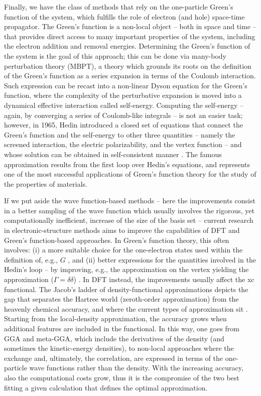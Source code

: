 Finally, we have the class of methods that rely on the one-particle Green's function of the system, which fulfills the role of electron (and hole) space-time propagator. The Green's function is a non-local object -- both in space and time -- that provides direct access to many important properties of the system, including the electron addition and removal energies. Determining the Green's function of the system is the goal of this approach; this can be done via many-body perturbation theory (MBPT), a theory which grounds its roots on the definition of the Green's function as a series expansion in terms of the Coulomb interaction. Such expression can be recast into a non-linear Dyson equation for the Green's function, where the complexity of the perturbative expansion is moved into a dynamical effective interaction called self-energy. Computing the self-energy -- again, by converging a series of Coulomb-like integrals -- is not an easier task; however, in 1965, Hedin introduced a closed set of equations that connect the Green's function and the self-energy to other three quantities -- namely the screened interaction, the electric polarizability, and the vertex function -- and whose solution can be obtained in self-consistent manner \cite{hedin_new_1965}. The famous \gw approximation results from the first loop over Hedin's equations, and represents one of the most successful applications of Green's function theory for the study of the properties of materials.

If we put aside the wave function-based methods -- here the improvements consist in a better sampling of the wave function which usually involves the rigorous, yet computationally inefficient, increase of the size of the basis set -- current research in electronic-structure methods aims to improve the capabilities of DFT and Green's function-based approaches. In Green's function theory, this often involves: (i) a more suitable choice for the one-electron states used within the definition of, e.g., $G$ \cite{bruneval_benchmarking_2013}, and (ii) better expressions for the quantities involved in the Hedin's loop -- by improving, e.g., the approximation on the vertex yielding the \gw approximation ($\Gamma=\delta \delta$) \cite{chen_accurate_2015}. In DFT instead, the improvements usually affect the xc functional. The Jacob's ladder of density-functional approximations depicts the gap that separates the Hartree world (zeroth-order approximation) from the heavenly chemical accuracy, and where the current types of approximation sit \cite{perdew_jacobs_2001}. Starting from the local-density approximation, the accuracy grows when additional features are included in the functional. In this way, one goes from GGA and meta-GGA, which include the derivatives of the density (and sometimes the kinetic-energy densities), to non-local approaches where the exchange and, ultimately, the correlation, are expressed in terms of the one-particle wave functions rather than the density. With the increasing accuracy, also the computational costs grow, thus it is the compromise of the two best fitting a given calculation that defines the optimal approximation.

